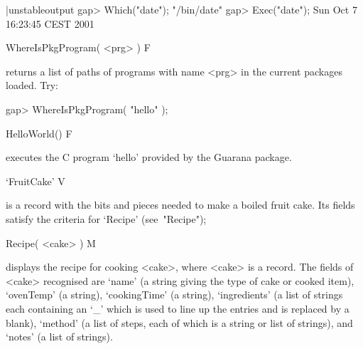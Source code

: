 \beginexample|unstableoutput
gap> Which("date");         
"/bin/date"
gap> Exec("date");
Sun Oct  7 16:23:45 CEST 2001
\endexample

\>WhereIsPkgProgram( <prg> ) F

returns a list of paths of  programs  with  name  <prg>  in  the  current
packages loaded. Try:

\beginexample
gap> WhereIsPkgProgram( "hello" );
\endexample

\>HelloWorld() F

executes the C program `hello' provided by the {Guarana} package.

\>`FruitCake' V

is a record with the bits and pieces needed to make a boiled fruit  cake.
Its fields satisfy the criteria for `Recipe' (see~"Recipe");

\>Recipe( <cake> ) M

displays the recipe for cooking <cake>, where <cake>  is  a  record.  The
fields of <cake> recognised are `name' (a string giving the type of  cake
or  cooked  item),  `ovenTemp'  (a  string),  `cookingTime'  (a  string),
`ingredients' (a list of strings each containing an `_' which is used  to
line up the entries and is replaced by a  blank),  `method'  (a  list  of
steps, each of which is a string or list of strings), and `notes' (a list
of strings).



